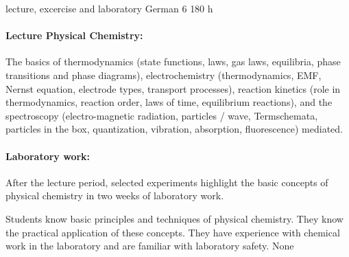 {lecture, excercise and laboratory}
{German}
{6}
{180 h}
{\paragraph{Lecture Physical Chemistry:} The basics of thermodynamics (state functions, laws, gas laws, equilibria, phase transitions and phase diagrams), electrochemistry (thermodynamics, EMF, Nernst equation, electrode types, transport processes), reaction kinetics (role in thermodynamics, reaction order, laws of time, equilibrium reactions), and the spectroscopy (electro-magnetic radiation, particles / wave, Termschemata, particles in the box, quantization, vibration, absorption, fluorescence) mediated.  \paragraph{Laboratory work:} After the lecture period, selected experiments highlight the basic concepts of physical chemistry in two weeks of laboratory work.}
{Students know basic principles and techniques of physical chemistry. They know the practical application of these concepts. They have experience with chemical work in the laboratory and are familiar with laboratory safety.}
{None}
